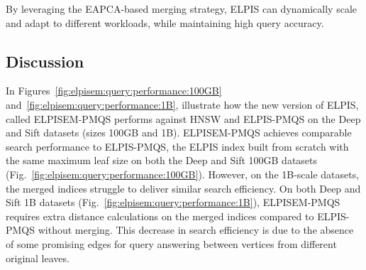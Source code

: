 By leveraging the EAPCA-based merging strategy, ELPIS can dynamically scale and adapt to different workloads,  while maintaining high query accuracy.
\subsection{Discussion}

In Figures~\ref{fig:elpisem:query:performance:100GB} and~\ref{fig:elpisem:query:performance:1B}, illustrate how the new version of ELPIS, called ELPISEM-PMQS performs against HNSW and ELPIS-PMQS %
on the Deep and Sift datasets (sizes 100GB and 1B). ELPISEM-PMQS achieves comparable search performance to ELPIS-PMQS, the ELPIS index built from scratch with the same maximum leaf size on both the Deep and Sift 100GB datasets (Fig.~\ref{fig:elpisem:query:performance:100GB}). However, on the 1B-scale datasets, the merged indices struggle to deliver similar search efficiency. On both Deep and Sift 1B datasets (Fig.~\ref{fig:elpisem:query:performance:1B}), ELPISEM-PMQS requires extra distance calculations on the merged indices compared to ELPIS-PMQS without merging. This decrease in search efficiency is due to the absence of some promising edges for query answering between vertices from different original leaves.

